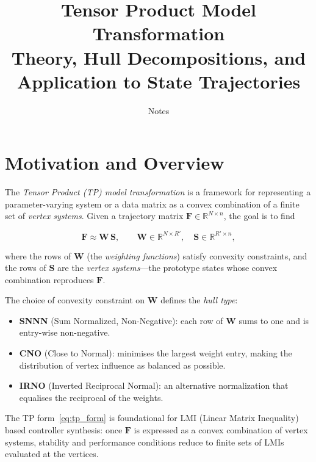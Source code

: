 \documentclass[11pt]{article}
\title{\textbf{Tensor Product Model Transformation}\\[0.5em]
\large Theory, Hull Decompositions, and Application to State Trajectories}
\author{Notes}
\date{}
\theoremstyle{definition}
\theoremstyle{plain}
\newcommand{\R}{\mathbb{R}}
\newcommand{\mat}[1]{\mathbf{#1}}
\begin{document}
\maketitle
\tableofcontents
\bigskip

\section{Motivation and Overview}

The \emph{Tensor Product (TP) model transformation} \cite{baranyi2004} is a
framework for representing a parameter-varying system or a data matrix as a
convex combination of a finite set of \emph{vertex systems}.
Given a trajectory matrix $\mat{F} \in \R^{N \times n}$, the goal is to find

\begin{equation}
  \mat{F} \approx \mat{W}\,\mat{S},
  \qquad \mat{W} \in \R^{N \times R'}, \quad \mat{S} \in \R^{R' \times n},
  \label{eq:tp_form}
\end{equation}

where the rows of $\mat{W}$ (the \emph{weighting functions}) satisfy
convexity constraints, and the rows of $\mat{S}$ are the
\emph{vertex systems}---the prototype states whose convex combination
reproduces $\mat{F}$.

The choice of convexity constraint on $\mat{W}$ defines the \emph{hull type}:
\begin{itemize}
  \item \textbf{SNNN} (Sum Normalized, Non-Negative): each row of $\mat{W}$
        sums to one and is entry-wise non-negative.
  \item \textbf{CNO} (Close to Normal): minimises the largest weight
        entry, making the distribution of vertex influence as balanced as possible.
  \item \textbf{IRNO} (Inverted Reciprocal Normal): an alternative
        normalization that equalises the reciprocal of the weights.
\end{itemize}

The TP form~\eqref{eq:tp_form} is foundational for LMI (Linear Matrix
Inequality) based controller synthesis: once $\mat{F}$ is expressed as a
convex combination of vertex systems, stability and performance
conditions reduce to finite sets of LMIs evaluated at the vertices.


\end{document}
